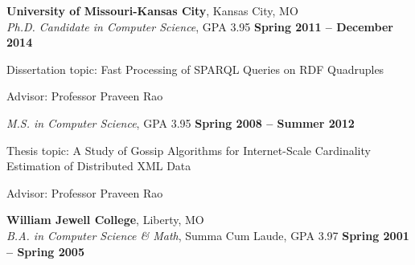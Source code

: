 \documentclass[margin,line]{resume}
\begin{document}
\begin{resume}
    \textbf{University of Missouri-Kansas City}, Kansas City, MO\\
    \textsl{Ph.D. Candidate in Computer Science}, GPA 3.95 \hfill \textbf{Spring 2011 -- December 2014}\vspace{-3mm}\\\vspace{-1mm}%
    \vspace{1mm}
    \begin{list3}
        \item Dissertation topic: Fast Processing of SPARQL Queries on RDF Quadruples
        \item Advisor:  Professor Praveen Rao
    \end{list3}\vspace{-1.5mm}
    \textsl{M.S. in Computer Science}, GPA 3.95 \hfill \textbf{Spring 2008 -- Summer 2012}\vspace{-3mm}\\\vspace{-1mm}%
    \vspace{1mm}
    \begin{list3}
        \item Thesis topic: A Study of Gossip Algorithms for Internet-Scale Cardinality Estimation of Distributed XML Data
        \item Advisor:  Professor Praveen Rao
    \end{list3}\vspace{-1.5mm}
    \textbf{William Jewell College}, Liberty, MO\\
    \textsl{B.A. in Computer Science \& Math}, Summa Cum Laude, GPA 3.97 \hfill \textbf{Spring 2001 -- Spring 2005}\vspace{-3mm}\\\vspace{-1mm}%


\end{resume}
\end{document}

